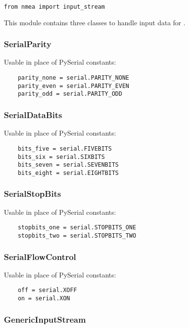 
\begin{verbatim}
from nmea import input_stream
\end{verbatim}

This module contains three classes to handle input data for \projname.

\subsubsection{SerialParity}

Usable in place of PySerial constants:

\begin{verbatim}
    parity_none = serial.PARITY_NONE
    parity_even = serial.PARITY_EVEN
    parity_odd = serial.PARITY_ODD
\end{verbatim}

\subsubsection{SerialDataBits}

Usable in place of PySerial constants:

\begin{verbatim}
    bits_five = serial.FIVEBITS
    bits_six = serial.SIXBITS
    bits_seven = serial.SEVENBITS
    bits_eight = serial.EIGHTBITS
\end{verbatim}

\subsubsection{SerialStopBits}

Usable in place of PySerial constants:

\begin{verbatim}
    stopbits_one = serial.STOPBITS_ONE
    stopbits_two = serial.STOPBITS_TWO
\end{verbatim}

\subsubsection{SerialFlowControl}

Usable in place of PySerial constants:

\begin{verbatim}
    off = serial.XOFF
    on = serial.XON
\end{verbatim}

\subsubsection{GenericInputStream}

